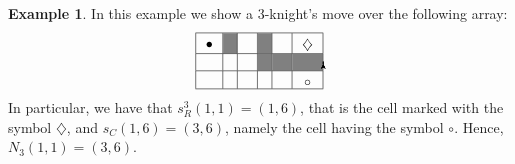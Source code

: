 \documentclass{amsart}
\theoremstyle{definition}
\newtheorem{ex}[prop]{Example}
\numberwithin{equation}{section}
\newcommand\tikzmark[2]{%
\tikz[remember picture,baseline] \node[inner sep=2pt,outer sep=0] (#1){#2};%
}
\newcommand\link[2]{%
\begin{tikzpicture}[remember picture, overlay, >=stealth, shift={(0,0)}]
  \draw[->] (#1) to (#2);
\end{tikzpicture}%
}
\begin{document}
\begin{ex}
In this example we show a $3$-knight's move over the following array: 
\[
\begin{array}{|c|c|c|c|c|c|} \hline
 \tikzmark{a}{$\bullet$ }&\cellcolor{gray}&\tikzmark{b}{}&\cellcolor{gray}&\tikzmark{c}{ }& \tikzmark{d}{$\diamondsuit$  } \\ \hline
&&&\cellcolor{gray}&\cellcolor{gray}& \cellcolor{gray} \\ \hline
&&&&& \tikzmark{e}{$\circ$ } \\ \hline
\end{array}
\link{a}{b}
\link{b}{c}
\link{d}{e}
\link{c}{d}
\]
In particular, we have that $s_R^3(1,1) = (1,6)$, that is the cell marked with the symbol $\diamondsuit$, and $s_C(1,6) = (3,6)$, namely the cell having the symbol $\circ$. Hence, $N_3(1,1) = (3,6)$.
\end{ex}
\end{document}
